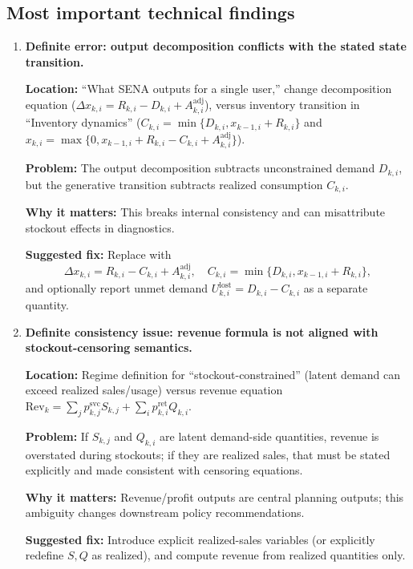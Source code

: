 \documentclass[11pt]{article}
\begin{document}
\subsection*{Most important technical findings}
\begin{enumerate}[leftmargin=*]

\item \textbf{Definite error: output decomposition conflicts with the stated state transition.}

\textbf{Location:} ``What SENA outputs for a single user,'' change decomposition equation ($\Delta x_{k,i}=R_{k,i}-D_{k,i}+A^{\mathrm{adj}}_{k,i}$), versus inventory transition in ``Inventory dynamics'' ($C_{k,i}=\min\{D_{k,i},x_{k-1,i}+R_{k,i}\}$ and $x_{k,i}=\max\{0,x_{k-1,i}+R_{k,i}-C_{k,i}+A^{\mathrm{adj}}_{k,i}\}$).

\textbf{Problem:} The output decomposition subtracts unconstrained demand $D_{k,i}$, but the generative transition subtracts realized consumption $C_{k,i}$.

\textbf{Why it matters:} This breaks internal consistency and can misattribute stockout effects in diagnostics.

\textbf{Suggested fix:} Replace with
\[
\Delta x_{k,i}=R_{k,i}-C_{k,i}+A^{\mathrm{adj}}_{k,i},\quad C_{k,i}=\min\{D_{k,i},x_{k-1,i}+R_{k,i}\},
\]
and optionally report unmet demand $U^{\mathrm{lost}}_{k,i}=D_{k,i}-C_{k,i}$ as a separate quantity.

\item \textbf{Definite consistency issue: revenue formula is not aligned with stockout-censoring semantics.}

\textbf{Location:} Regime definition for ``stockout-constrained'' (latent demand can exceed realized sales/usage) versus revenue equation $\text{Rev}_k=\sum_j p^{\mathrm{svc}}_{k,j}S_{k,j}+\sum_i p^{\mathrm{ret}}_{k,i}Q_{k,i}$.

\textbf{Problem:} If $S_{k,j}$ and $Q_{k,i}$ are latent demand-side quantities, revenue is overstated during stockouts; if they are realized sales, that must be stated explicitly and made consistent with censoring equations.

\textbf{Why it matters:} Revenue/profit outputs are central planning outputs; this ambiguity changes downstream policy recommendations.

\textbf{Suggested fix:} Introduce explicit realized-sales variables (or explicitly redefine $S,Q$ as realized), and compute revenue from realized quantities only.


\end{enumerate}
\end{document}
